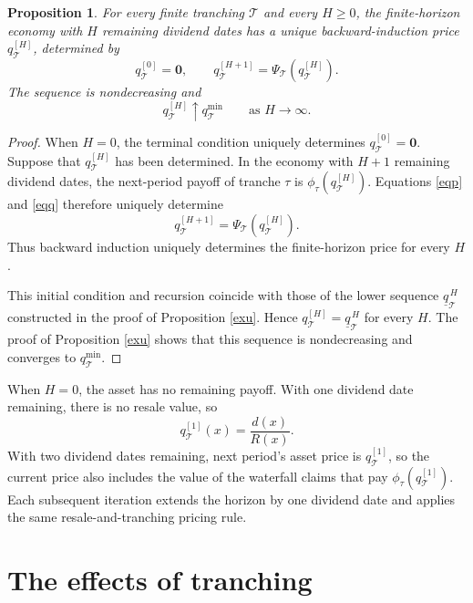 \documentclass[11pt]{article}
\theoremstyle{plain}
\newtheorem{prp}{Proposition}%
\begin{document}
\begin{prp}\label{prp:finite-selection}
For every finite tranching $\mathcal{T}$ and every $H\geq0$, the finite-horizon economy with $H$ remaining dividend dates has a unique backward-induction price $q_{\mathcal{T}}^{[H]}$, determined by
\[
q_{\mathcal{T}}^{[0]}=\mathbf{0},
\qquad
q_{\mathcal{T}}^{[H+1]}
=\Psi_{\mathcal{T}}\left(q_{\mathcal{T}}^{[H]}\right).
\]
The sequence is nondecreasing and
\[
q_{\mathcal{T}}^{[H]}
\uparrow
q_{\mathcal{T}}^{\min}
\qquad
\text{as }H\to\infty.
\]
\end{prp}

\begin{proof}
When $H=0$, the terminal condition uniquely determines $q_{\mathcal{T}}^{[0]}=\mathbf{0}$. Suppose that $q_{\mathcal{T}}^{[H]}$ has been determined. In the economy with $H+1$ remaining dividend dates, the next-period payoff of tranche $\tau$ is $\phi_\tau(q_{\mathcal{T}}^{[H]})$. Equations \eqref{eqp} and \eqref{eqq} therefore uniquely determine
\[
q_{\mathcal{T}}^{[H+1]}
=
\Psi_{\mathcal{T}}\left(q_{\mathcal{T}}^{[H]}\right).
\]
Thus backward induction uniquely determines the finite-horizon price for every $H$.

This initial condition and recursion coincide with those of the lower sequence $\underline q_{\mathcal{T}}^{\,H}$ constructed in the proof of Proposition \ref{exu}. Hence $q_{\mathcal{T}}^{[H]}=\underline q_{\mathcal{T}}^{\,H}$ for every $H$. The proof of Proposition \ref{exu} shows that this sequence is nondecreasing and converges to $q_{\mathcal{T}}^{\min}$.
\end{proof}

When $H=0$, the asset has no remaining payoff. With one dividend date remaining, there is no resale value, so
\[
q_{\mathcal{T}}^{[1]}(x)=\frac{d(x)}{R(x)}.
\]
With two dividend dates remaining, next period's asset price is $q_{\mathcal{T}}^{[1]}$, so the current price also includes the value of the waterfall claims that pay $\phi_\tau(q_{\mathcal{T}}^{[1]})$. Each subsequent iteration extends the horizon by one dividend date and applies the same resale-and-tranching pricing rule.

\section{The effects of tranching} \label{sec:eff}
\end{document}
